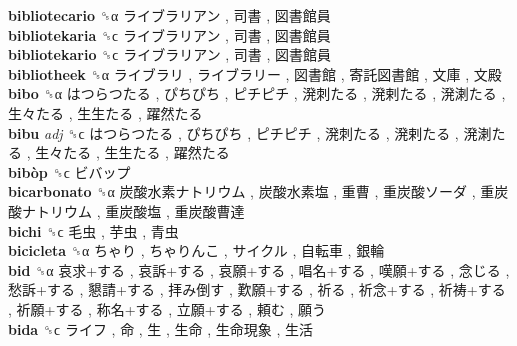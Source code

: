 \textbf{bibliotecario} ␝α   ライブラリアン ,  司書 ,  図書館員   \\
\textbf{bibliotekaria} ␝ϲ   ライブラリアン ,  司書 ,  図書館員   \\
\textbf{bibliotekario} ␝ϲ   ライブラリアン ,  司書 ,  図書館員   \\
\textbf{bibliotheek} ␝α   ライブラリ ,  ライブラリー ,  図書館 ,  寄託図書館 ,  文庫 ,  文殿   \\
\textbf{bibo} ␝α   はつらつたる ,  ぴちぴち ,  ピチピチ ,  溌刺たる ,  溌剌たる ,  溌溂たる ,  生々たる ,  生生たる ,  躍然たる   \\
\textbf{bibu} \emph{adj}  ␝ϲ   はつらつたる ,  ぴちぴち ,  ピチピチ ,  溌刺たる ,  溌剌たる ,  溌溂たる ,  生々たる ,  生生たる ,  躍然たる   \\
\textbf{bibòp} ␝ϲ   ビバップ   \\
\textbf{bicarbonato} ␝α   炭酸水素ナトリウム ,  炭酸水素塩 ,  重曹 ,  重炭酸ソーダ ,  重炭酸ナトリウム ,  重炭酸塩 ,  重炭酸曹達   \\
\textbf{bichi} ␝ϲ   毛虫 ,  芋虫 ,  青虫   \\
\textbf{bicicleta} ␝α   ちゃり ,  ちゃりんこ ,  サイクル ,  自転車 ,  銀輪   \\
\textbf{bid} ␝α   哀求+する ,  哀訴+する ,  哀願+する ,  唱名+する ,  嘆願+する ,  念じる ,  愁訴+する ,  懇請+する ,  拝み倒す ,  歎願+する ,  祈る ,  祈念+する ,  祈祷+する ,  祈願+する ,  称名+する ,  立願+する ,  頼む ,  願う   \\
\textbf{bida} ␝ϲ   ライフ ,  命 ,  生 ,  生命 ,  生命現象 ,  生活   \\
